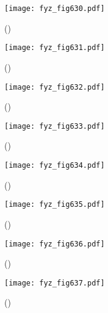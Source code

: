     \begin{figure}[ht!] %
      \centering
      \texttt{[image: fyz\_fig630.pdf]}
      \caption{
               (\cite[s.~707]{Feynman02})}
      \label{fyz_fig630}
    \end{figure}

    \begin{figure}[ht!] %
      \centering
      \texttt{[image: fyz\_fig631.pdf]}
      \caption{
               (\cite[s.~707]{Feynman02})}
      \label{fyz_fig631}
    \end{figure}

    \begin{figure}[ht!] %
      \centering
      \texttt{[image: fyz\_fig632.pdf]}
      \caption{
               (\cite[s.~707]{Feynman02})}
      \label{fyz_fig632}
    \end{figure}

    \begin{figure}[ht!] %
      \centering
      \texttt{[image: fyz\_fig633.pdf]}
      \caption{
               (\cite[s.~707]{Feynman02})}
      \label{fyz_fig633}
    \end{figure}

    \begin{figure}[ht!] %
      \centering
      \texttt{[image: fyz\_fig634.pdf]}
      \caption{
               (\cite[s.~707]{Feynman02})}
      \label{fyz_fig634}
    \end{figure}

    \begin{figure}[ht!] %
      \centering
      \texttt{[image: fyz\_fig635.pdf]}
      \caption{
               (\cite[s.~707]{Feynman02})}
      \label{fyz_fig635}
    \end{figure}

    \begin{figure}[ht!] %
      \centering
      \texttt{[image: fyz\_fig636.pdf]}
      \caption{
               (\cite[s.~707]{Feynman02})}
      \label{fyz_fig636}
    \end{figure}

    \begin{figure}[ht!] %
      \centering
      \texttt{[image: fyz\_fig637.pdf]}
      \caption{
               (\cite[s.~707]{Feynman02})}
      \label{fyz_fig637}
    \end{figure}

